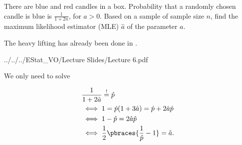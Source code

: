 
\begin{exercise}

There are blue and red candles in a box.
Probability that a randomly chosen candle is blue is $\frac{1}{1 + 2 n}$, for $a > 0$.
Based on a sample of sample size $n$, find the maximum likelihood estimator (MLE) $\hat a$ of the parameter $a$.

\end{exercise}


\begin{solution}

The heavy lifting has already been done in \cite[lecture 6, slides 58-60]{EStat}.


{../../../EStat_VO/Lecture Slides/Lecture 6.pdf}

We only need to solve

\begin{align*}
    &
    \frac{1}{1 + 2 \hat a} \stackrel{!}{=} \hat p \\
    & \iff
    1 = \hat p (1 + 3 \hat a) = \hat p + 2 \hat a \hat p \\
    & \iff
    1 - \hat p = 2 \hat a \hat p \\
    & \iff
    \frac{1}{2}
    \pbraces
    {
        \frac{1}{\hat p} - 1
    }
    =
    \hat a.
\end{align*}

\end{solution}

